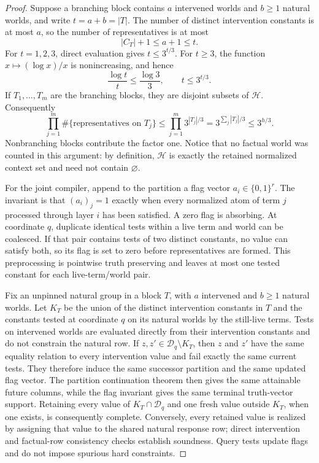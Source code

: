 \documentclass{article}
\begin{document}
\begin{proof}
Suppose a branching block contains \(a\) intervened worlds and \(b\geq1\) natural worlds, and write \(t=a+b=|T|\).  The number of distinct intervention constants is at most \(a\), so the number of representatives is at most
\[
 |C_T|+1\leq a+1\leq t.
\]
For \(t=1,2,3\), direct evaluation gives \(t\leq3^{t/3}\).  For \(t\geq3\), the function \(x\mapsto(\log x)/x\) is nonincreasing, and hence
\[
 \frac{\log t}{t}\leq\frac{\log3}{3},
 \qquad t\leq3^{t/3}.
\]
If \(T_1,\ldots,T_m\) are the branching blocks, they are disjoint subsets of \(\mathcal H\).  Consequently
\[
 \prod_{j=1}^m \#\{\text{representatives on }T_j\}
 \leq \prod_{j=1}^m3^{|T_j|/3}
 =3^{\sum_j|T_j|/3}
 \leq3^{h/3}.
\tag{1}
\]
Nonbranching blocks contribute the factor one.  Notice that no factual world was counted in this argument: by definition, \(\mathcal H\) is exactly the retained normalized context set and need not contain \(\varnothing\).

For the joint compiler, append to the partition a flag vector \(a_i\in\{0,1\}^r\).  The invariant is that \((a_i)_j=1\) exactly when every normalized atom of term \(j\) processed through layer \(i\) has been satisfied.  A zero flag is absorbing.  At coordinate \(q\), duplicate identical tests within a live term and world can be coalesced.  If that pair contains tests of two distinct constants, no value can satisfy both, so its flag is set to zero before representatives are formed.  This preprocessing is pointwise truth preserving and leaves at most one tested constant for each live-term/world pair.

Fix an unpinned natural group in a block \(T\), with \(a\) intervened and \(b\geq1\) natural worlds.  Let \(K_T\) be the union of the distinct intervention constants in \(T\) and the constants tested at coordinate \(q\) on its natural worlds by the still-live terms.  Tests on intervened worlds are evaluated directly from their intervention constants and do not constrain the natural row.  If \(z,z'\in\mathcal D_q\setminus K_T\), then \(z\) and \(z'\) have the same equality relation to every intervention value and fail exactly the same current tests.  They therefore induce the same successor partition and the same updated flag vector.  The partition continuation theorem then gives the same attainable future columns, while the flag invariant gives the same terminal truth-vector support.  Retaining every value of \(K_T\cap\mathcal D_q\) and one fresh value outside \(K_T\), when one exists, is consequently complete.  Conversely, every retained value is realized by assigning that value to the shared natural response row; direct intervention and factual-row consistency checks establish soundness.  Query tests update flags and do not impose spurious hard constraints.


\end{proof}
\end{document}
